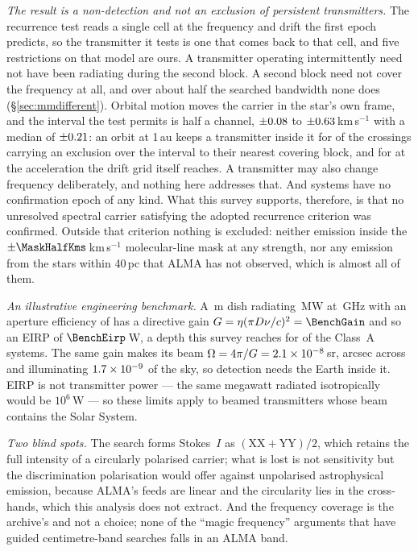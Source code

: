 \noindent\emph{The result is a non-detection and not an exclusion of
persistent transmitters.} The recurrence test reads a single cell at the
frequency and drift the first epoch predicts, so the transmitter it tests is
one that comes back to that cell, and five restrictions on that model are
ours. A transmitter operating intermittently need not have been radiating
during the second block. A second block need not cover the frequency at all,
and over about half the searched bandwidth none does
(\S\ref{sec:mmdifferent}). Orbital motion moves the carrier in the star's own
frame, and the interval the test permits is half a channel, $\pm0.08$ to
$\pm0.63$\,km\,s$^{-1}$ with a median of $\pm0.21$: an orbit at
1\,au keeps a transmitter inside it for \RqNOrbNear{} of the \RqNUnit{}
crossings carrying an exclusion over the interval to their nearest covering
block, and for \RqOrbGridWord{} at the acceleration the drift grid itself
reaches. A transmitter may also change frequency deliberately, and nothing
here addresses that. And \ScSysNoConf{} systems have no confirmation epoch of
any kind. What this survey supports, therefore, is that no unresolved spectral
carrier satisfying the adopted recurrence criterion was confirmed. Outside
that criterion nothing is excluded: neither emission inside the
$\pm\MaskHalfKms$\,km\,s$^{-1}$ molecular-line mask at any strength, nor any
emission from the \NGaiaCensus{} stars within 40\,pc that ALMA has not
observed, which is almost all of them.

\noindent\emph{An illustrative engineering benchmark.} A \BenchDiam\,m dish
radiating \BenchPowerMW\,MW at \BenchFreqGHz\,GHz with an aperture efficiency
of \BenchEta{} has a directive gain $G=\eta(\pi D\nu/c)^{2}=\BenchGain$ and so
an EIRP of $\BenchEirp$\,W, a depth this survey reaches for \BenchNSysA{} of
the \NSysClassA{} Class~A systems. The same gain makes its beam
$\Omega=4\pi/G=2.1\times10^{-8}$\,sr, \BmArcsec{} arcsec across and illuminating
$1.7\times10^{-9}$ of the sky, so detection needs the Earth inside it. EIRP is not
transmitter power --- the same megawatt radiated isotropically
would be $10^{6}$\,W --- so these limits apply to beamed transmitters whose
beam contains the Solar System.

\noindent\emph{Two blind spots.} The search forms Stokes~$I$ as
$(\mathrm{XX}+\mathrm{YY})/2$, which retains the full intensity of a circularly polarised
carrier; what is lost is not sensitivity but the discrimination polarisation
would offer against unpolarised astrophysical emission, because ALMA's feeds
are linear and the circularity lies in the cross-hands, which this analysis
does not extract. And the frequency coverage is the archive's and not a choice; none
of the ``magic frequency'' arguments that have guided centimetre-band searches
falls in an ALMA band.

